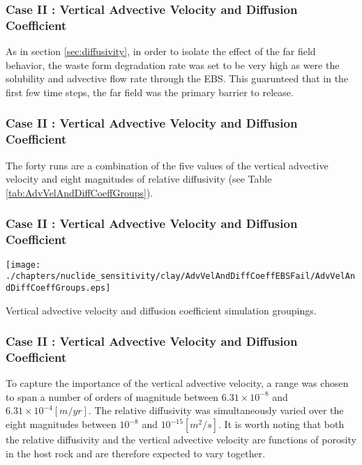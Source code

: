 \begin{frame}[c]
  \frametitle{Case II : Vertical Advective Velocity and Diffusion Coefficient}

As in section \ref{sec:diffusivity}, in order to isolate the effect of the far 
field behavior, the waste form degradation rate was set to be very high as were 
the solubility and advective flow rate through the  \gls{EBS}. This guarunteed 
that in the first few time steps, the far field was the primary barrier to 
release. 
\end{frame}

\begin{frame}[c]
  \frametitle{Case II : Vertical Advective Velocity and Diffusion Coefficient}


The forty runs are a combination of the five values of the vertical advective 
velocity and eight magnitudes of relative diffusivity (see Table 
\ref{tab:AdvVelAndDiffCoeffGroups}). 
\end{frame}

\begin{frame}[c]
  \frametitle{Case II : Vertical Advective Velocity and Diffusion Coefficient}

\begin{table}[hbp!]
\centering
\texttt{[image: ./chapters/nuclide\_sensitivity/clay/AdvVelAndDiffCoeffEBSFail/AdvVelAndDiffCoeffGroups.eps]}
\caption{Vertical advective velocity and diffusion coefficient simulation groupings.}
\label{tab:AdvVelAndDiffCoeffGroups}
\end{table}
\end{frame}


\begin{frame}[c]
  \frametitle{Case II : Vertical Advective Velocity and Diffusion Coefficient}
To capture the importance of the vertical advective velocity, a range was chosen 
to span a number of orders of magnitude between $ 6.31\times 10^{-8}$ 
and $ 6.31\times10^{-4} [m/yr]$. The relative diffusivity was simultaneously varied 
over the eight magnitudes between $ 10^{-8}$ and $ 10^{-15} [m^2/s]$. It is 
worth noting that both the relative diffusivity and the vertical advective 
velocity are functions of porosity in the host rock and are therefore expected 
to vary together. 


\end{frame}

